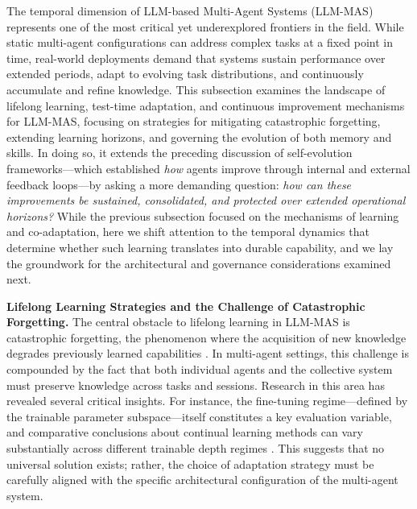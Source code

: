 \documentclass[11pt]{article}
\begin{document}
The temporal dimension of LLM-based Multi-Agent Systems (LLM-MAS) represents one of the most critical yet underexplored frontiers in the field. While static multi-agent configurations can address complex tasks at a fixed point in time, real-world deployments demand that systems sustain performance over extended periods, adapt to evolving task distributions, and continuously accumulate and refine knowledge. This subsection examines the landscape of lifelong learning, test-time adaptation, and continuous improvement mechanisms for LLM-MAS, focusing on strategies for mitigating catastrophic forgetting, extending learning horizons, and governing the evolution of both memory and skills. In doing so, it extends the preceding discussion of self-evolution frameworks---which established \emph{how} agents improve through internal and external feedback loops---by asking a more demanding question: \emph{how can these improvements be sustained, consolidated, and protected over extended operational horizons?} While the previous subsection focused on the mechanisms of learning and co-adaptation, here we shift attention to the temporal dynamics that determine whether such learning translates into durable capability, and we lay the groundwork for the architectural and governance considerations examined next.

\textbf{Lifelong Learning Strategies and the Challenge of Catastrophic Forgetting.} The central obstacle to lifelong learning in LLM-MAS is catastrophic forgetting, the phenomenon where the acquisition of new knowledge degrades previously learned capabilities \cite{ref168,ref169}. In multi-agent settings, this challenge is compounded by the fact that both individual agents and the collective system must preserve knowledge across tasks and sessions. Research in this area has revealed several critical insights. For instance, the fine-tuning regime---defined by the trainable parameter subspace---itself constitutes a key evaluation variable, and comparative conclusions about continual learning methods can vary substantially across different trainable depth regimes \cite{ref170}. This suggests that no universal solution exists; rather, the choice of adaptation strategy must be carefully aligned with the specific architectural configuration of the multi-agent system.
\end{document}
